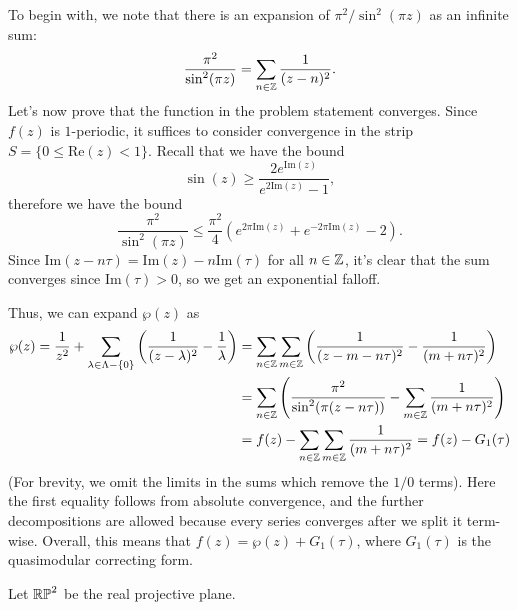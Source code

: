 \documentclass{pset}
\begin{document}
\begin{solution}
  To begin with, we note that there is an expansion of $\pi^2/\sin^2(\pi z)$ as an infinite sum:
  \[
    \frac{\pi^2}{\sin^2(\pi z)} = \sum_{n\in \mathbb{Z}}\frac{1}{(z-n)^2}.
  \]
  Let's now prove that the function in the problem statement converges. Since $f(z)$ is $1$-periodic, it suffices to consider convergence in the strip $S = \{0\leq \textrm{Re}(z) < 1\}$. Recall that we have the bound
  \[
    \sin(z)\geq \frac{2e^{\textrm{Im}(z)}}{e^{2\textrm{Im}(z)}-1},
  \]
  therefore we have the bound
  \[
    \frac{\pi^2}{\sin^2(\pi z)} \leq \frac{\pi^2}{4}\left(e^{2\pi \textrm{Im}(z)} + e^{-2\pi \textrm{Im}(z)} - 2\right).
  \]
  Since $\textrm{Im}(z-n\tau)=\textrm{Im}(z)-n\textrm{Im}(\tau)$ for all $n \in \mathbb{Z}$, it's clear that the sum converges since $\textrm{Im}(\tau)>0$, so we get an exponential falloff.

  Thus, we can expand $\wp(z)$ as 
  \[
    \begin{aligned}
      \wp(z) = \frac{1}{z^2}+\sum_{\lambda\in \Lambda-\{0\}}\left(\frac{1}{(z-\lambda)^2}-\frac{1}{\lambda}\right) 
      &= \sum_{n\in \mathbb{Z}}\sum_{m\in \mathbb{Z}}\left(\frac{1}{(z-m-n\tau)^2}-\frac{1}{(m+n\tau)^2}\right)\\
      &= \sum_{n\in \mathbb{Z}}\left(\frac{\pi^2}{\sin^2(\pi (z-n\tau))} - \sum_{m\in \mathbb{Z}}\frac{1}{(m+n\tau)^2}\right)\\
      &= f(z) - \sum_{n\in \mathbb{Z}}\sum_{m\in \mathbb{Z}}\frac{1}{(m+n\tau)^2} = f(z) - G_1(\tau)
    \end{aligned}
  \]
  (For brevity, we omit the limits in the sums which remove the $1/0$ terms). Here the first equality follows from absolute convergence, and the further decompositions are allowed because every series converges after we split it term-wise. Overall, this means that $f(z)=\wp(z)+G_1(\tau)$, where $G_1(\tau)$ is the quasimodular correcting form.
\end{solution}

\begin{problem}{5.9}
  Let $\mathbb{RP}^2$ be the real projective plane.
\end{problem}
\end{document}

